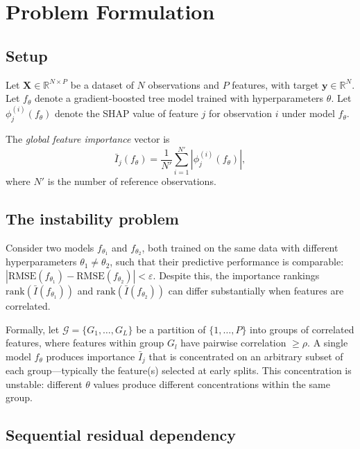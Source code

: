 \documentclass[11pt]{article}
\newcommand{\rhovar}{\rho}
\begin{document}
\section{Problem Formulation}
\label{sec:problem}

\subsection{Setup}

Let $\mathbf{X} \in \mathbb{R}^{N \times P}$ be a dataset of $N$
observations and $P$ features, with target $\mathbf{y} \in \mathbb{R}^N$.
Let $f_\theta$ denote a gradient-boosted tree model trained with
hyperparameters $\theta$. Let $\phi_j^{(i)}(f_\theta)$ denote the SHAP
value of feature $j$ for observation $i$ under model $f_\theta$.

The \emph{global feature importance} vector is
\begin{equation}
  \bar{I}_j(f_\theta) = \frac{1}{N'} \sum_{i=1}^{N'} |\phi_j^{(i)}(f_\theta)|,
  \label{eq:global_importance}
\end{equation}
where $N'$ is the number of reference observations.

\subsection{The instability problem}

Consider two models $f_{\theta_1}$ and $f_{\theta_2}$, both trained on the
same data with different hyperparameters $\theta_1 \neq \theta_2$, such
that their predictive performance is comparable:
$|\text{RMSE}(f_{\theta_1}) - \text{RMSE}(f_{\theta_2})| < \varepsilon$.
Despite this, the importance rankings
$\text{rank}(\bar{I}(f_{\theta_1}))$ and
$\text{rank}(\bar{I}(f_{\theta_2}))$ can differ substantially when
features are correlated.

Formally, let $\mathcal{G} = \{G_1, \ldots, G_L\}$ be a partition of
$\{1, \ldots, P\}$ into groups of correlated features, where features
within group $G_l$ have pairwise correlation $\geq \rhovar$. A single
model $f_\theta$ produces importance $\bar{I}_j$ that is concentrated on
an arbitrary subset of each group---typically the feature(s) selected at
early splits. This concentration is unstable: different $\theta$ values
produce different concentrations within the same group.

\subsection{Sequential residual dependency}
\end{document}
